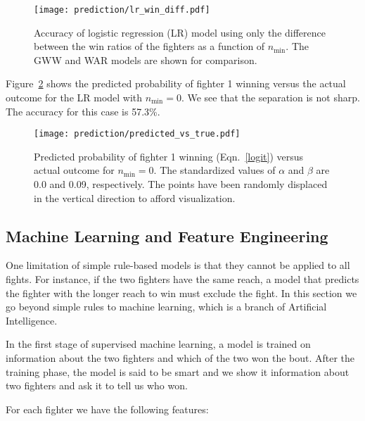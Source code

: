 \begin{figure}[h]
\begin{center}
\texttt{[image: prediction/lr\_win\_diff.pdf]}
\caption{Accuracy of logistic regression (LR) model using
only the difference between the win ratios of the fighters
as a function of $n_{\textrm{min}}$. The GWW and WAR models are
shown for comparison.}
\label{lr_win_diff}
\end{center}
\end{figure}

Figure~\ref{predicted_vs_true} shows the predicted probability
of fighter 1 winning versus the actual outcome for the LR model
with $n_{\textrm{min}}=0$. We see that the separation is not sharp.
The accuracy for this case is 57.3\%.

\begin{figure}[h!]
\begin{center}
\texttt{[image: prediction/predicted\_vs\_true.pdf]}
\caption{Predicted probability of fighter 1 winning (Eqn.~\ref{logit}) versus
actual outcome for $n_{\textrm{min}}=0$.
The standardized values
of $\alpha$ and $\beta$ are 0.0 and 0.09, respectively.
The points have been randomly displaced in the vertical
direction to afford visualization.}
\label{predicted_vs_true}
\end{center}
\end{figure}

\clearpage
\subsection*{Machine Learning and Feature Engineering}

One limitation of simple rule-based models is that they
cannot be applied to all fights. For instance, if the two fighters
have the same reach, a model that predicts the fighter with the longer
reach to win must exclude the fight.
In this section we go beyond simple rules to machine learning,
which is a branch of Artificial Intelligence.

In the first stage of supervised machine learning, a model
is trained on information about the two fighters
and which of the two won the bout. After the training phase,
the model is said to be smart and we show it information about
two fighters and ask it to tell us who won.

For each fighter we have the following features:

